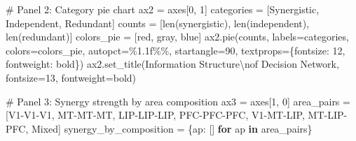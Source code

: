 \documentclass[
  11pt,
  letterpaper,
  oneside,
  openany]{book}
\newenvironment{Shaded}{\begin{snugshade}}{\end{snugshade}}
\newcommand{\BuiltInTok}[1]{\textcolor[rgb]{0.00,0.23,0.31}{#1}}
\newcommand{\CharTok}[1]{\textcolor[rgb]{0.13,0.47,0.30}{#1}}
\newcommand{\CommentTok}[1]{\textcolor[rgb]{0.37,0.37,0.37}{#1}}
\newcommand{\ControlFlowTok}[1]{\textcolor[rgb]{0.00,0.23,0.31}{\textbf{#1}}}
\newcommand{\DecValTok}[1]{\textcolor[rgb]{0.68,0.00,0.00}{#1}}
\newcommand{\KeywordTok}[1]{\textcolor[rgb]{0.00,0.23,0.31}{\textbf{#1}}}
\newcommand{\NormalTok}[1]{\textcolor[rgb]{0.00,0.23,0.31}{#1}}
\newcommand{\OperatorTok}[1]{\textcolor[rgb]{0.37,0.37,0.37}{#1}}
\newcommand{\SpecialCharTok}[1]{\textcolor[rgb]{0.37,0.37,0.37}{#1}}
\newcommand{\StringTok}[1]{\textcolor[rgb]{0.13,0.47,0.30}{#1}}
\begin{document}
\begin{Shaded}
\begin{Highlighting}[]
\CommentTok{\# Panel 2: Category pie chart}
\NormalTok{ax2 }\OperatorTok{=}\NormalTok{ axes[}\DecValTok{0}\NormalTok{, }\DecValTok{1}\NormalTok{]}
\NormalTok{categories }\OperatorTok{=}\NormalTok{ [}\StringTok{\textquotesingle{}Synergistic\textquotesingle{}}\NormalTok{, }\StringTok{\textquotesingle{}Independent\textquotesingle{}}\NormalTok{, }\StringTok{\textquotesingle{}Redundant\textquotesingle{}}\NormalTok{]}
\NormalTok{counts }\OperatorTok{=}\NormalTok{ [}\BuiltInTok{len}\NormalTok{(synergistic), }\BuiltInTok{len}\NormalTok{(independent), }\BuiltInTok{len}\NormalTok{(redundant)]}
\NormalTok{colors\_pie }\OperatorTok{=}\NormalTok{ [}\StringTok{\textquotesingle{}red\textquotesingle{}}\NormalTok{, }\StringTok{\textquotesingle{}gray\textquotesingle{}}\NormalTok{, }\StringTok{\textquotesingle{}blue\textquotesingle{}}\NormalTok{]}
\NormalTok{ax2.pie(counts, labels}\OperatorTok{=}\NormalTok{categories, colors}\OperatorTok{=}\NormalTok{colors\_pie, autopct}\OperatorTok{=}\StringTok{\textquotesingle{}}\SpecialCharTok{\%1.1f\%\%}\StringTok{\textquotesingle{}}\NormalTok{,}
\NormalTok{       startangle}\OperatorTok{=}\DecValTok{90}\NormalTok{, textprops}\OperatorTok{=}\NormalTok{\{}\StringTok{\textquotesingle{}fontsize\textquotesingle{}}\NormalTok{: }\DecValTok{12}\NormalTok{, }\StringTok{\textquotesingle{}fontweight\textquotesingle{}}\NormalTok{: }\StringTok{\textquotesingle{}bold\textquotesingle{}}\NormalTok{\})}
\NormalTok{ax2.set\_title(}\StringTok{\textquotesingle{}Information Structure}\CharTok{\textbackslash{}n}\StringTok{of Decision Network\textquotesingle{}}\NormalTok{, }
\NormalTok{             fontsize}\OperatorTok{=}\DecValTok{13}\NormalTok{, fontweight}\OperatorTok{=}\StringTok{\textquotesingle{}bold\textquotesingle{}}\NormalTok{)}

\CommentTok{\# Panel 3: Synergy strength by area composition}
\NormalTok{ax3 }\OperatorTok{=}\NormalTok{ axes[}\DecValTok{1}\NormalTok{, }\DecValTok{0}\NormalTok{]}
\NormalTok{area\_pairs }\OperatorTok{=}\NormalTok{ [}\StringTok{\textquotesingle{}V1{-}V1{-}V1\textquotesingle{}}\NormalTok{, }\StringTok{\textquotesingle{}MT{-}MT{-}MT\textquotesingle{}}\NormalTok{, }\StringTok{\textquotesingle{}LIP{-}LIP{-}LIP\textquotesingle{}}\NormalTok{, }\StringTok{\textquotesingle{}PFC{-}PFC{-}PFC\textquotesingle{}}\NormalTok{,}
             \StringTok{\textquotesingle{}V1{-}MT{-}LIP\textquotesingle{}}\NormalTok{, }\StringTok{\textquotesingle{}MT{-}LIP{-}PFC\textquotesingle{}}\NormalTok{, }\StringTok{\textquotesingle{}Mixed\textquotesingle{}}\NormalTok{]}
\NormalTok{synergy\_by\_composition }\OperatorTok{=}\NormalTok{ \{ap: [] }\ControlFlowTok{for}\NormalTok{ ap }\KeywordTok{in}\NormalTok{ area\_pairs\}}


\end{Highlighting}
\end{Shaded}
\end{document}
